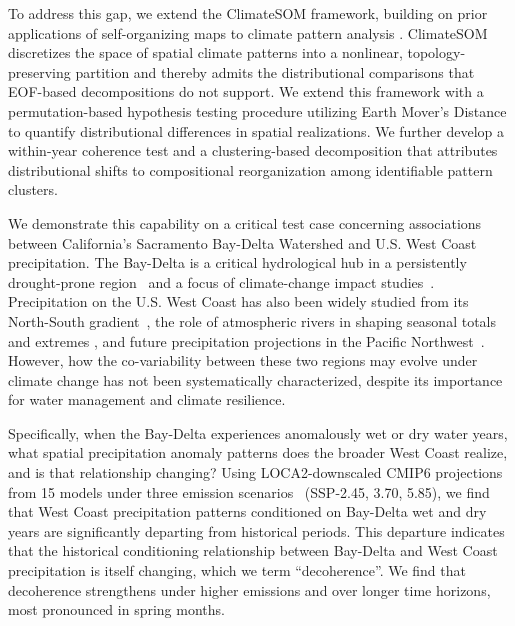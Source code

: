 %
%
To address this gap, we extend the ClimateSOM framework, building on prior applications of self-organizing maps to climate pattern analysis \cite{hewitson_self-organizing_2002, gibson_use_2017}. ClimateSOM discretizes the space of spatial climate patterns into a nonlinear, topology-preserving partition and thereby admits the distributional comparisons that EOF-based decompositions do not support. We extend this framework with a permutation-based hypothesis testing procedure utilizing Earth Mover's Distance to quantify distributional differences in spatial realizations.
%
We further develop a within-year coherence test and a clustering-based decomposition that attributes distributional shifts to compositional reorganization among identifiable pattern clusters.

We demonstrate this capability on a critical test case concerning associations between California's Sacramento Bay-Delta Watershed and U.S. West Coast precipitation.
%
The Bay-Delta is a critical hydrological hub in a persistently drought-prone region~\cite{cloern2011projected} and a focus of climate-change impact studies~\cite{rojas-aguirre_evaluating_2025}.
%
Precipitation on the U.S. West Coast has also been widely studied from its North-South gradient~\cite{dettinger1998north}, the role of atmospheric rivers in shaping seasonal totals and extremes \cite{gershunov_assessing_2017, gershunov_precipitation_2019}, and future precipitation projections in the Pacific Northwest~\cite{abatzoglou2014seasonal}.
%
However, how the co-variability between these two regions may evolve under climate change has not been systematically characterized, despite its importance for water management and climate resilience.

Specifically, when the Bay-Delta experiences anomalously wet or dry water years, what spatial precipitation anomaly patterns does the broader West Coast realize, and is that relationship changing?
%
Using LOCA2-downscaled CMIP6 projections~\cite{pierce2014statistical,pierce2015improved,eyring2016overview} from 15 models under three emission scenarios~\cite{riahi2017shared} (SSP-2.45, 3.70, 5.85), we find that West Coast precipitation patterns conditioned on Bay-Delta wet and dry years are significantly departing from historical periods.
%
This departure indicates that the historical conditioning relationship between Bay-Delta and West Coast precipitation is itself changing, which we term ``decoherence''. We find that decoherence strengthens under higher emissions and over longer time horizons, most pronounced in spring months.

